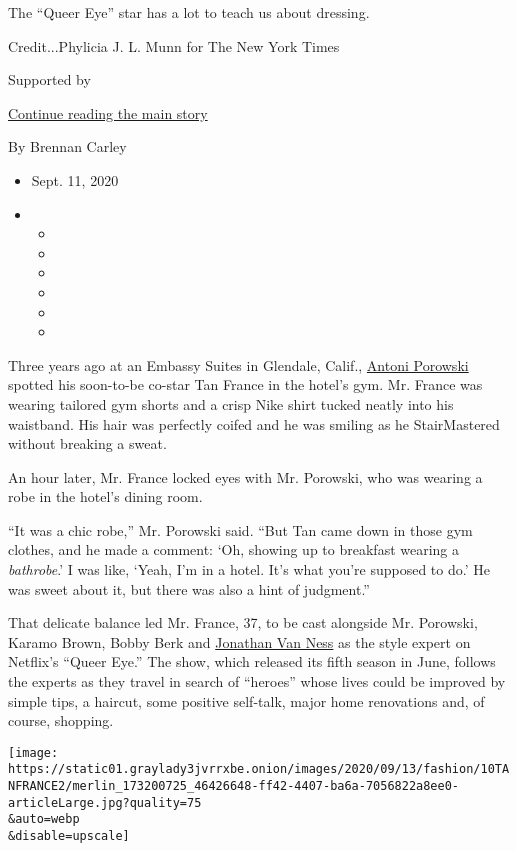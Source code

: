 The ``Queer Eye'' star has a lot to teach us about dressing.

Credit...Phylicia J. L. Munn for The New York Times

Supported by

\protect\hyperlink{after-sponsor}{Continue reading the main story}

By Brennan Carley

\begin{itemize}
\item
  Sept. 11, 2020
\item
  \begin{itemize}
  \item
  \item
  \item
  \item
  \item
  \item
  \end{itemize}
\end{itemize}

Three years ago at an Embassy Suites in Glendale, Calif.,
\href{https://www.nytimes3xbfgragh.onion/2018/03/06/style/antoni-porowski-queer-eye-cooking.html}{Antoni
Porowski} spotted his soon-to-be co-star Tan France in the hotel's gym.
Mr. France was wearing tailored gym shorts and a crisp Nike shirt tucked
neatly into his waistband. His hair was perfectly coifed and he was
smiling as he StairMastered without breaking a sweat.

An hour later, Mr. France locked eyes with Mr. Porowski, who was wearing
a robe in the hotel's dining room.

``It was a chic robe,'' Mr. Porowski said. ``But Tan came down in those
gym clothes, and he made a comment: `Oh, showing up to breakfast wearing
a \emph{bathrobe}.' I was like, `Yeah, I'm in a hotel. It's what you're
supposed to do.' He was sweet about it, but there was also a hint of
judgment.''

That delicate balance led Mr. France, 37, to be cast alongside Mr.
Porowski, Karamo Brown, Bobby Berk and
\href{https://www.nytimes3xbfgragh.onion/2019/09/21/style/jonathan-van-ness-hiv-memoir.html}{Jonathan
Van Ness} as the style expert on Netflix's ``Queer Eye.'' The show,
which released its fifth season in June, follows the experts as they
travel in search of ``heroes'' whose lives could be improved by simple
tips, a haircut, some positive self-talk, major home renovations and, of
course, shopping.

\texttt{[image: https://static01.graylady3jvrrxbe.onion/images/2020/09/13/fashion/10TANFRANCE2/merlin\_173200725\_46426648-ff42-4407-ba6a-7056822a8ee0-articleLarge.jpg?quality=75\\\&auto=webp\\\&disable=upscale]}

